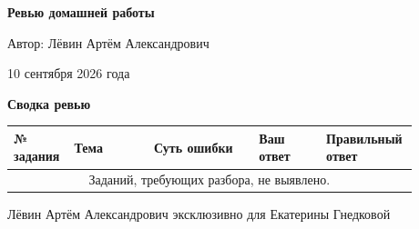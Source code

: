 \documentclass[12pt,a4paper]{article}
\begin{document}
\begin{titlepage}
  \centering
  \vspace*{0.24\textheight}

  {\LARGE\bfseries Ревью домашней работы\par}
  \vspace{2.2cm}

  {\large Автор: Лёвин Артём Александрович\par}
  \vspace{0.8cm}
  {\large 10 сентября 2026 года\par}

  \vfill
\end{titlepage}

\newpage
\begin{center}
  {\Large\bfseries Сводка ревью}
\end{center}

\vspace{1.2cm}

\begin{center}
\small
\begin{tabular}{p{0.12\linewidth} p{0.19\linewidth} p{0.25\linewidth} p{0.16\linewidth} p{0.16\linewidth}}
\toprule
\textbf{№ задания} & \textbf{Тема} & \textbf{Суть ошибки} & \textbf{Ваш ответ} & \textbf{Правильный ответ} \\
\midrule
\multicolumn{5}{c}{Заданий, требующих разбора, не выявлено.} \\
\bottomrule
\end{tabular}
\end{center}

\vfill
\begin{center}
\small Лёвин Артём Александрович эксклюзивно для Екатерины Гнедковой
\end{center}
\end{document}
